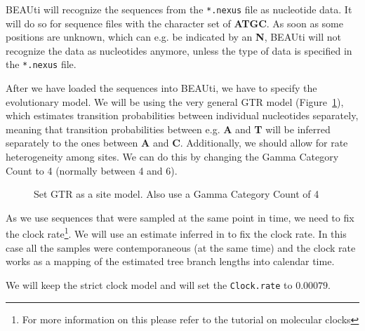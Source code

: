 \documentclass[11pt]{article}
\newcommand{\fixme}[1]{\textcolor{red}{\texttt{{\bf FIX ME:} #1}}}
\begin{document}
BEAUti will recognize the sequences from the \texttt{*.nexus} file as nucleotide data. It will do so for sequence files with the character set of \textbf{ATGC}. As soon as some positions are unknown, which can e.g. be indicated by an \textbf{N}, BEAUti will not recognize the data as nucleotides anymore, unless the type of data is specified in the \texttt{*.nexus} file.

After we have loaded the sequences into BEAUti, we have to specify the evolutionary model. We will be using the very general GTR model (Figure~\ref{fig:model}), which estimates transition probabilities between individual nucleotides separately, meaning that transition probabilities between e.g. \textbf{A} and \textbf{T} will be inferred separately to the ones between \textbf{A} and \textbf{C}. Additionally, we should allow for rate heterogeneity among sites. We can do this by changing the Gamma Category Count to 4 (normally between 4 and 6).


\begin{figure}[h!]
\centering
{}
\caption{\small Set GTR as a site model. Also use a Gamma Category Count of 4}
\label{fig:model}
\end{figure}
\clearpage

As we use sequences that were sampled at the same point in time, we need to fix the clock rate\footnote{For more information on this please refer to the tutorial on molecular clocks}. We will use an estimate inferred in \citet{Pybus2001} to fix the clock rate. In this case all the samples were contemporaneous (at the same time) and the clock rate works as a mapping of the estimated tree branch lengths into calendar time.

We will keep the strict clock model and will set the \texttt{Clock.rate} to $0.00079$.

\end{document}
